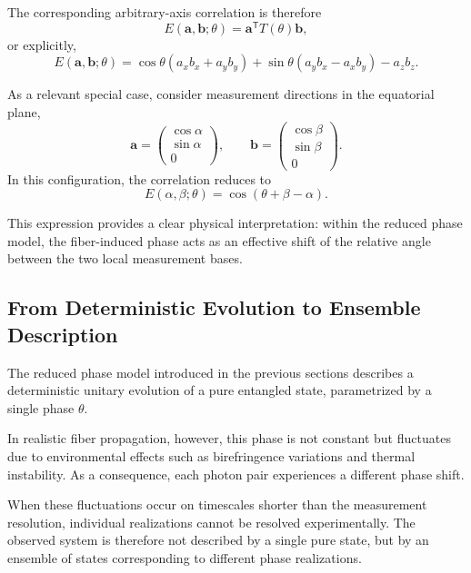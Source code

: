 \documentclass[a4paper]{article}
\begin{document}
\medskip

The corresponding arbitrary-axis correlation is therefore
\[
E(\mathbf{a},\mathbf{b};\theta)
=
\mathbf{a}^{\mathsf T}T(\theta)\mathbf{b},
\]
or explicitly,
\[
E(\mathbf{a},\mathbf{b};\theta)
=
\cos\theta(a_xb_x+a_yb_y)
+
\sin\theta(a_yb_x-a_xb_y)
-
a_zb_z.
\]

\medskip

As a relevant special case, consider measurement directions in the equatorial plane,
\[
\mathbf{a}=
\begin{pmatrix}
\cos\alpha\\
\sin\alpha\\
0
\end{pmatrix},
\qquad
\mathbf{b}=
\begin{pmatrix}
\cos\beta\\
\sin\beta\\
0
\end{pmatrix}.
\]
In this configuration, the correlation reduces to
\[
E(\alpha,\beta;\theta)
=
\cos(\theta+\beta-\alpha).
\]

\medskip

This expression provides a clear physical interpretation: within the reduced phase model, the fiber-induced phase acts as an effective shift of the relative angle between the two local measurement bases.

\subsection{From Deterministic Evolution to Ensemble Description}

The reduced phase model introduced in the previous sections describes a deterministic unitary evolution of a pure entangled state, parametrized by a single phase \(\theta\).

In realistic fiber propagation, however, this phase is not constant but fluctuates due to environmental effects such as birefringence variations and thermal instability. As a consequence, each photon pair experiences a different phase shift.

When these fluctuations occur on timescales shorter than the measurement resolution, individual realizations cannot be resolved experimentally. The observed system is therefore not described by a single pure state, but by an ensemble of states corresponding to different phase realizations.

\medskip
\end{document}
